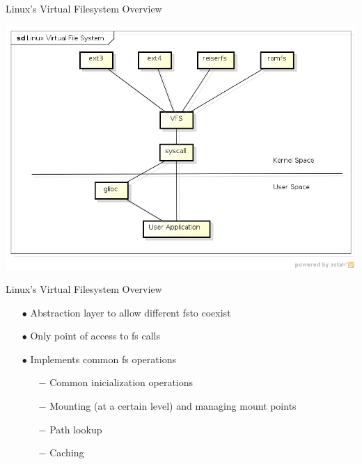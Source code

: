 \documentclass{beamer}
\begin{document}
\begin{frame}{Linux's Virtual Filesystem Overview}

	\includegraphics[scale=0.5]{img/vfs_overview.png}

\end{frame}

\begin{frame}{Linux's Virtual Filesystem Overview}

	\begin{itemize}[<+->]
	
		\item[$\bullet$]{Abstraction layer to allow different fs\footnotemark[1] to coexist}	
		\item[$\bullet$]{Only point of access to fs calls}
		\item[$\bullet$]{Implements common fs operations}
			\begin{itemize}
				\item[$-$]{Common inicialization operations}
				\item[$-$]{Mounting (at a certain level) and managing mount points}
				\item[$-$]{Path lookup}
				\item[$-$]{Caching}
			\end{itemize}	
	\end{itemize}


\end{frame}
\end{document}
